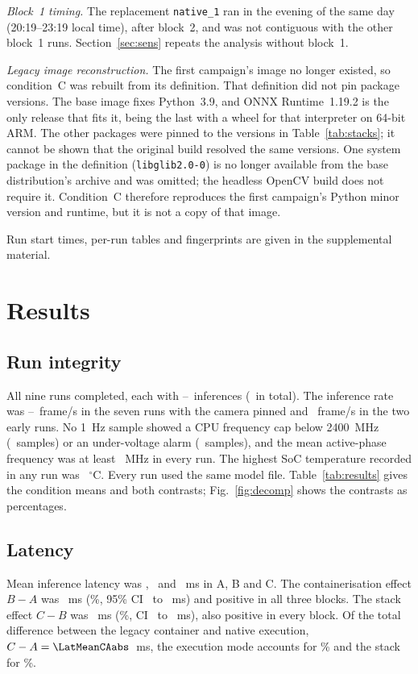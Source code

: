 \documentclass[10pt,journal,compsoc]{IEEEtran}
\begin{document}
\emph{Block~1 timing.} The replacement \texttt{native\_1} ran in the evening of the same day (20:19--23:19 local time), after block~2, and was not contiguous with the other block~1 runs. Section~\ref{sec:sens} repeats the analysis without block~1.

\emph{Legacy image reconstruction.} The first campaign's image no longer existed, so condition~C was rebuilt from its definition. That definition did not pin package versions. The base image fixes Python~3.9, and ONNX Runtime~1.19.2 is the only release that fits it, being the last with a wheel for that interpreter on 64-bit ARM. The other packages were pinned to the versions in Table~\ref{tab:stacks}; it cannot be shown that the original build resolved the same versions. One system package in the definition (\texttt{libglib2.0-0}) is no longer available from the base distribution's archive and was omitted; the headless OpenCV build does not require it. Condition~C therefore reproduces the first campaign's Python minor version and runtime, but it is not a copy of that image.

Run start times, per-run tables and fingerprints are given in the supplemental material.

\section{Results}\label{sec:results}

\subsection{Run integrity}
All nine runs completed, each with \TotFramesMin--\TotFramesMax\ inferences (\FramesAll\ in total). The inference rate was \FPSPinnedMin--\FPSPinnedMax~frame/s in the seven runs with the camera pinned and \FPSEarlyMin~frame/s in the two early runs. No 1~Hz sample showed a CPU frequency cap below 2400~MHz (\CapSamples\ samples) or an under-voltage alarm (\UVSamples\ samples), and the mean active-phase frequency was at least \MHzMin~MHz in every run. The highest SoC temperature recorded in any run was \TMaxAll~$^\circ$C. Every run used the same model file. Table~\ref{tab:results} gives the condition means and both contrasts; Fig.~\ref{fig:decomp} shows the contrasts as percentages.



\subsection{Latency}
Mean inference latency was \LatMeanA, \LatMeanB\ and \LatMeanC~ms in A, B and C. The containerisation effect $B-A$ was \LatMeanBAabs~ms (\LatMeanBApctabs\%, 95\% CI \LatMeanBAlo\ to \LatMeanBAhi~ms) and positive in all three blocks. The stack effect $C-B$ was \LatMeanCBabs~ms (\LatMeanCBpctabs\%, CI \LatMeanCBlo\ to \LatMeanCBhi~ms), also positive in every block. Of the total difference between the legacy container and native execution, $C-A=\LatMeanCAabs$~ms, the execution mode accounts for \ShareContainer\% and the stack for \ShareStack\%.
\end{document}
